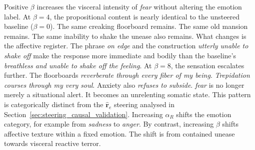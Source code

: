 Positive $\beta$ increases the visceral intensity of \textit{fear} without altering the emotion label. At $\beta=4$, the propositional content is nearly identical to the unsteered baseline ($\beta=0$). The same creaking floorboard remains. The same old mansion remains. The same inability to shake the unease also remains. What changes is the affective register. The phrase \textit{on edge} and the construction \textit{utterly unable to shake off} make the response more immediate and bodily than the baseline's \textit{breathless and unable to shake off the feeling}. At $\beta=8$, the sensation escalates further. The floorboards \textit{reverberate through every fiber of my being}. \textit{Trepidation courses through my very soul}. Anxiety also \textit{refuses to subside}. \textit{fear} is no longer merely a situational alert. It becomes an unrelenting somatic state. This pattern is categorically distinct from the $\hat{\mathbf{r}}_e$ steering analysed in Section~\ref{sec:steering_causal_validation}. Increasing $\alpha_R$ shifts the emotion category, for example from \textit{sadness} to \textit{anger}. By contrast, increasing $\beta$ shifts affective texture within a fixed emotion. The shift is from contained unease towards visceral reactive terror.\par


